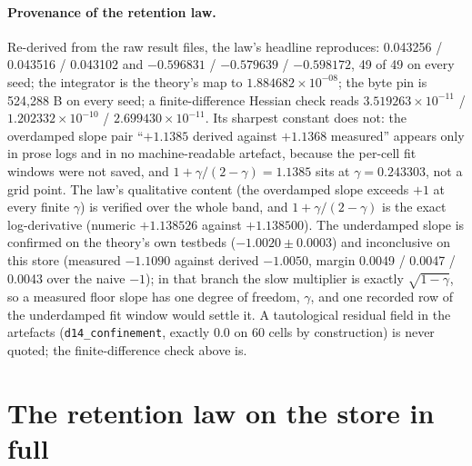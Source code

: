 \documentclass{article}
\newcommand{\sci}[2]{\ensuremath{#1\times10^{#2}}}
\begin{document}
\paragraph{Provenance of the retention law.} Re-derived from the raw result files, the law's
headline reproduces: 0.043256 / 0.043516 / 0.043102 and $-0.596831$ / $-0.579639$ / $-0.598172$,
49 of 49 on every seed; the integrator is the theory's map to \sci{1.884682}{-08}; the byte pin is
524,288 B on every seed; a finite-difference Hessian check reads \sci{3.519263}{-11} /
\sci{1.202332}{-10} / \sci{2.699430}{-11}.
Its sharpest constant does not: the overdamped slope pair ``$+1.1385$ derived against $+1.1368$
measured'' appears only in prose logs and in no machine-readable artefact, because the per-cell fit
windows were not saved, and $1+\gamma/(2-\gamma)=1.1385$ sits at $\gamma=0.243303$, not a grid
point. The law's qualitative content (the overdamped slope exceeds $+1$ at every finite $\gamma$)
is verified over the whole band, and $1+\gamma/(2-\gamma)$ is the exact log-derivative (numeric
$+1.138526$ against $+1.138500$). The underdamped slope is confirmed on the theory's own testbeds
($-1.0020\pm0.0003$) and inconclusive on this store (measured $-1.1090$ against derived $-1.0050$,
margin 0.0049 / 0.0047 / 0.0043 over the naive $-1$); in that branch the slow multiplier is exactly
$\sqrt{1-\gamma}$, so a measured floor slope has one degree of freedom, $\gamma$, and one recorded row
of the underdamped fit window would settle it. A tautological residual field in the artefacts
(\texttt{d14\_confinement}, exactly 0.0 on 60 cells by construction) is never quoted; the
finite-difference check above is.

\section{The retention law on the store in full}
\label{app:physics}
\end{document}
